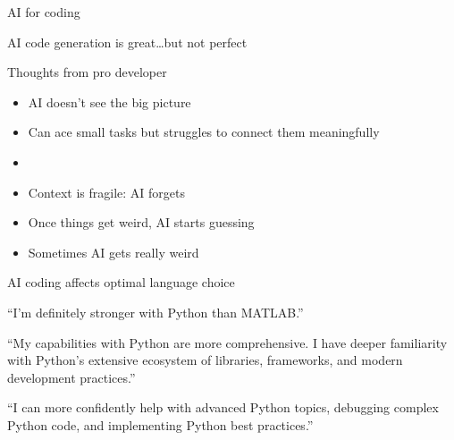 \begin{frame}{AI for coding}
    
    \begin{figure}
       \centering
    \end{figure}

\end{frame}

\begin{frame}
    
    AI code generation is great\ldots but not perfect

\end{frame}


\begin{frame}

    Thoughts from pro developer 

    \begin{itemize}
        \item AI doesn't see the big picture
        \vspace{0.5em}
        \item Can ace small tasks but struggles to connect them meaningfully
        \vspace{0.5em}
        \item {}
        \vspace{0.5em}
        \item Context is fragile: AI forgets
        \vspace{0.5em}
        \item Once things get weird, AI starts guessing
        \vspace{0.5em}
        \item Sometimes AI gets really weird
    \end{itemize}

\end{frame}


\begin{frame}{AI coding affects optimal language choice}
    
    ``I'm definitely stronger with Python than MATLAB.''

    \vspace{0.5em}
    \vspace{0.5em}
    ``My capabilities with Python
    are more comprehensive. I have deeper familiarity with Python's extensive
    ecosystem of libraries, frameworks, and modern development practices.''


    \vspace{0.5em}
    \vspace{0.5em}
    ``I can
    more confidently help with advanced Python topics, debugging complex Python
    code, and implementing Python best practices.''

\end{frame}

